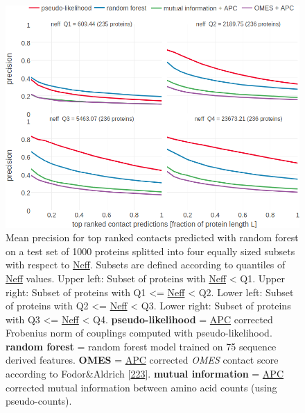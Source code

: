 \documentclass[11pt,a4paper,twoside]{book}
\theoremstyle{definition}
\theoremstyle{definition}
\theoremstyle{remark}
\begin{document}
\begin{figure}
\includegraphics[width=1\linewidth]{img/random_forest_contact_prior/precision_vs_rank_facetted_by_neff_notitle} \caption{Mean precision for top ranked contacts
predicted with random forest on a test set of 1000 proteins splitted
into four equally sized subsets with respect to
\protect\hyperlink{abbrev}{Neff}. Subsets are defined according to
quantiles of \protect\hyperlink{abbrev}{Neff} values. Upper left: Subset
of proteins with \protect\hyperlink{abbrev}{Neff} \textless{} Q1. Upper
right: Subset of proteins with Q1 \textless{}=
\protect\hyperlink{abbrev}{Neff} \textless{} Q2. Lower left: Subset of
proteins with Q2 \textless{}= \protect\hyperlink{abbrev}{Neff}
\textless{} Q3. Lower right: Subset of proteins with Q3 \textless{}=
\protect\hyperlink{abbrev}{Neff} \textless{} Q4.
\textbf{pseudo-likelihood} = \protect\hyperlink{abbrev}{APC} corrected
Frobenius norm of couplings computed with pseudo-likelihood.
\textbf{random forest} = random forest model trained on 75 sequence
derived features. \textbf{OMES} = \protect\hyperlink{abbrev}{APC}
corrected \emph{OMES} contact score according to Fodor\&Aldrich
{[}\protect\hyperlink{ref-Fodor2004a}{223}{]}. \textbf{mutual
information} = \protect\hyperlink{abbrev}{APC} corrected mutual
information between amino acid counts (using pseudo-counts).}\label{fig:performance-neff-rf}
\end{figure}
\end{document}
